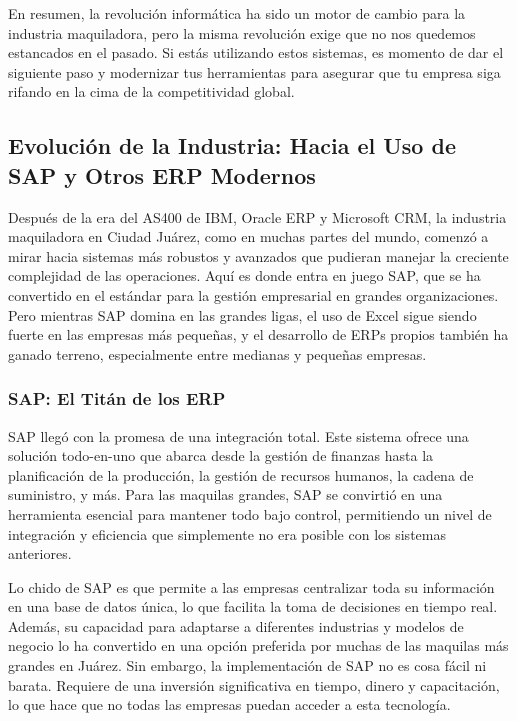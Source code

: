 \documentclass[
  10pt,
  letterpaper,
]{book}
\begin{document}
En resumen, la revolución informática ha sido un motor de cambio para la
industria maquiladora, pero la misma revolución exige que no nos
quedemos estancados en el pasado. Si estás utilizando estos sistemas, es
momento de dar el siguiente paso y modernizar tus herramientas para
asegurar que tu empresa siga rifando en la cima de la competitividad
global.

\subsection{Evolución de la Industria: Hacia el Uso de SAP y Otros ERP
Modernos}\label{evoluciuxf3n-de-la-industria-hacia-el-uso-de-sap-y-otros-erp-modernos}

Después de la era del AS400 de IBM, Oracle ERP y Microsoft CRM, la
industria maquiladora en Ciudad Juárez, como en muchas partes del mundo,
comenzó a mirar hacia sistemas más robustos y avanzados que pudieran
manejar la creciente complejidad de las operaciones. Aquí es donde entra
en juego SAP, que se ha convertido en el estándar para la gestión
empresarial en grandes organizaciones. Pero mientras SAP domina en las
grandes ligas, el uso de Excel sigue siendo fuerte en las empresas más
pequeñas, y el desarrollo de ERPs propios también ha ganado terreno,
especialmente entre medianas y pequeñas empresas.

\subsubsection{SAP: El Titán de los
ERP}\label{sap-el-tituxe1n-de-los-erp}

SAP llegó con la promesa de una integración total. Este sistema ofrece
una solución todo-en-uno que abarca desde la gestión de finanzas hasta
la planificación de la producción, la gestión de recursos humanos, la
cadena de suministro, y más. Para las maquilas grandes, SAP se convirtió
en una herramienta esencial para mantener todo bajo control, permitiendo
un nivel de integración y eficiencia que simplemente no era posible con
los sistemas anteriores.

Lo chido de SAP es que permite a las empresas centralizar toda su
información en una base de datos única, lo que facilita la toma de
decisiones en tiempo real. Además, su capacidad para adaptarse a
diferentes industrias y modelos de negocio lo ha convertido en una
opción preferida por muchas de las maquilas más grandes en Juárez. Sin
embargo, la implementación de SAP no es cosa fácil ni barata. Requiere
de una inversión significativa en tiempo, dinero y capacitación, lo que
hace que no todas las empresas puedan acceder a esta tecnología.
\end{document}
